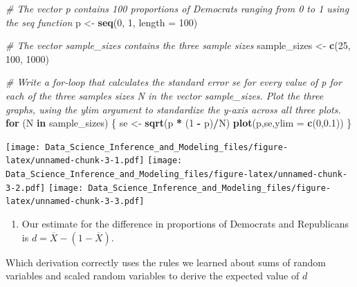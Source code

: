 \documentclass[
]{article}
\newenvironment{Shaded}{\begin{snugshade}}{\end{snugshade}}
\newcommand{\CommentTok}[1]{\textcolor[rgb]{0.56,0.35,0.01}{\textit{#1}}}
\newcommand{\ControlFlowTok}[1]{\textcolor[rgb]{0.13,0.29,0.53}{\textbf{#1}}}
\newcommand{\DataTypeTok}[1]{\textcolor[rgb]{0.13,0.29,0.53}{#1}}
\newcommand{\DecValTok}[1]{\textcolor[rgb]{0.00,0.00,0.81}{#1}}
\newcommand{\FloatTok}[1]{\textcolor[rgb]{0.00,0.00,0.81}{#1}}
\newcommand{\KeywordTok}[1]{\textcolor[rgb]{0.13,0.29,0.53}{\textbf{#1}}}
\newcommand{\NormalTok}[1]{#1}
\newcommand{\OperatorTok}[1]{\textcolor[rgb]{0.81,0.36,0.00}{\textbf{#1}}}
\newcommand{\StringTok}[1]{\textcolor[rgb]{0.31,0.60,0.02}{#1}}
\providecommand{\tightlist}{%
  \setlength{\itemsep}{0pt}\setlength{\parskip}{0pt}}
\begin{document}
\begin{Shaded}
\begin{Highlighting}[]
\CommentTok{\# The vector \textasciigrave{}p\textasciigrave{} contains 100 proportions of Democrats ranging from 0 to 1 using the \textasciigrave{}seq\textasciigrave{} function}
\NormalTok{p \textless{}{-}}\StringTok{ }\KeywordTok{seq}\NormalTok{(}\DecValTok{0}\NormalTok{, }\DecValTok{1}\NormalTok{, }\DataTypeTok{length =} \DecValTok{100}\NormalTok{)}

\CommentTok{\# The vector \textasciigrave{}sample\_sizes\textasciigrave{} contains the three sample sizes}
\NormalTok{sample\_sizes \textless{}{-}}\StringTok{ }\KeywordTok{c}\NormalTok{(}\DecValTok{25}\NormalTok{, }\DecValTok{100}\NormalTok{, }\DecValTok{1000}\NormalTok{)}

\CommentTok{\# Write a for{-}loop that calculates the standard error \textasciigrave{}se\textasciigrave{} for every value of \textasciigrave{}p\textasciigrave{} for each of the three samples sizes \textasciigrave{}N\textasciigrave{} in the vector \textasciigrave{}sample\_sizes\textasciigrave{}. Plot the three graphs, using the \textasciigrave{}ylim\textasciigrave{} argument to standardize the y{-}axis across all three plots.}
\ControlFlowTok{for}\NormalTok{ (N }\ControlFlowTok{in}\NormalTok{ sample\_sizes)}
\NormalTok{\{}
\NormalTok{se \textless{}{-}}\StringTok{ }\KeywordTok{sqrt}\NormalTok{(p }\OperatorTok{*}\StringTok{ }\NormalTok{(}\DecValTok{1} \OperatorTok{{-}}\StringTok{ }\NormalTok{p)}\OperatorTok{/}\NormalTok{N)}
\KeywordTok{plot}\NormalTok{(p,se,}\DataTypeTok{ylim =} \KeywordTok{c}\NormalTok{(}\DecValTok{0}\NormalTok{,}\FloatTok{0.1}\NormalTok{))}
\NormalTok{\}}
\end{Highlighting}
\end{Shaded}

\texttt{[image: Data\_Science\_Inference\_and\_Modeling\_files/figure-latex/unnamed-chunk-3-1.pdf]}
\texttt{[image: Data\_Science\_Inference\_and\_Modeling\_files/figure-latex/unnamed-chunk-3-2.pdf]}
\texttt{[image: Data\_Science\_Inference\_and\_Modeling\_files/figure-latex/unnamed-chunk-3-3.pdf]}

\begin{enumerate}
\def\labelenumi{\arabic{enumi}.}
\setcounter{enumi}{6}
\tightlist
\item
  Our estimate for the difference in proportions of Democrats and
  Republicans is \(d = \overline{X} − (1 − \overline{X})\).
\end{enumerate}

Which derivation correctly uses the rules we learned about sums of
random variables and scaled random variables to derive the expected
value of \(d\)
\end{document}
